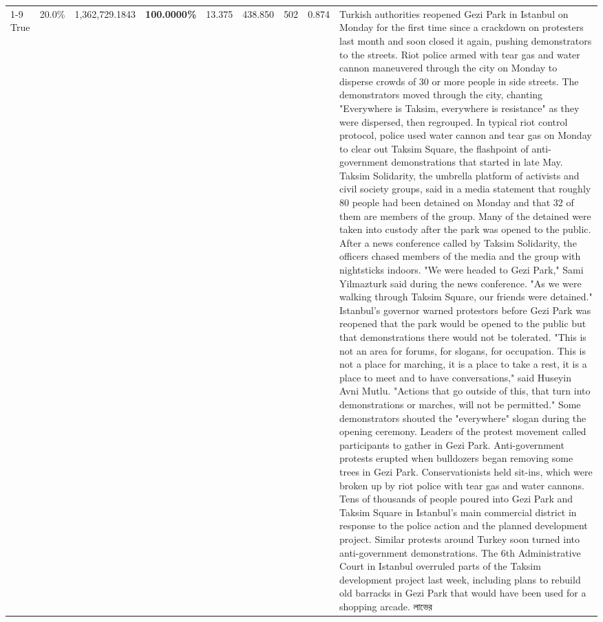 \begin{table}[H]
\begin{tabular}{lllrlllll}
\cline{1-9}
True & 20.0\% & 1,362,729.1843 & \bfseries \color{red} 100.0000\% & 13.375 & 438.850 & 502 & 0.874 & Turkish authorities reopened Gezi Park in Istanbul on Monday for the first time since a crackdown on protesters last month and soon closed it again, pushing demonstrators to the streets. Riot police armed with tear gas and water cannon maneuvered through the city on Monday to disperse crowds of 30 or more people in side streets. The demonstrators moved through the city, chanting "Everywhere is Taksim, everywhere is resistance" as they were dispersed, then regrouped. In typical riot control protocol, police used water cannon and tear gas on Monday to clear out Taksim Square, the flashpoint of anti-government demonstrations that started in late May. Taksim Solidarity, the umbrella platform of activists and civil society groups, said in a media statement that roughly 80 people had been detained on Monday and that 32 of them are members of the group. Many of the detained were taken into custody after the park was opened to the public. After a news conference called by Taksim Solidarity, the officers chased members of the media and the group with nightsticks indoors. "We were headed to Gezi Park," Sami Yilmazturk said during the news conference. "As we were walking through Taksim Square, our friends were detained." Istanbul's governor warned protestors before Gezi Park was reopened that the park would be opened to the public but that demonstrations there would not be tolerated. "This is not an area for forums, for slogans, for occupation. This is not a place for marching, it is a place to take a rest, it is a place to meet and to have conversations," said Huseyin Avni Mutlu. "Actions that go outside of this, that turn into demonstrations or marches, will not be permitted." Some demonstrators shouted the "everywhere" slogan during the opening ceremony. Leaders of the protest movement called participants to gather in Gezi Park. Anti-government protests erupted when bulldozers began removing some trees in Gezi Park. Conservationists held sit-ins, which were broken up by riot police with tear gas and water cannons. Tens of thousands of people poured into Gezi Park and Taksim Square in Istanbul's main commercial district in response to the police action and the planned development project. Similar protests around Turkey soon turned into anti-government demonstrations. The 6th Administrative Court in Istanbul overruled parts of the Taksim development project last week, including plans to rebuild old barracks in Gezi Park that would have been used for a shopping arcade. লাভের \\

\end{tabular}
\end{table}
